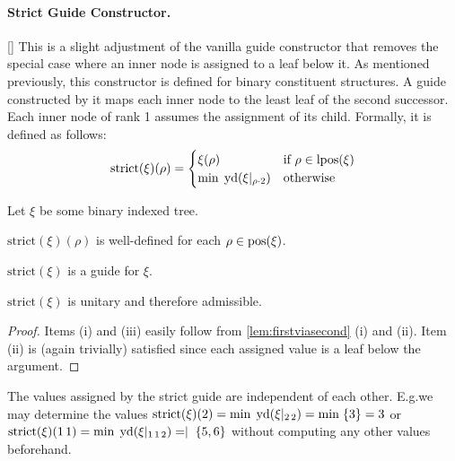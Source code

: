 \documentclass[../../document.tex]{subfiles}
\begin{document}
    \paragraph{Strict Guide Constructor.}[]
    This is a slight adjustment of the vanilla guide constructor that removes the special case where an inner node is assigned to a leaf below it.
    As mentioned previously, this constructor is defined for binary constituent structures.
    A guide constructed by it maps each inner node to the least leaf of the second successor.
    Each inner node of rank 1 assumes the assignment of its child.
    Formally, it is defined as follows:
    \[
    \mathrm{strict}(\xi)(\rho) = \begin{cases}
        \xi(\rho)   & \text{if $\rho \in \operatorname{lpos}(\xi)$}\\
        \min\;\operatorname{yd}(\xi|_{\rho\cdot 2}) &\text{otherwise}
    \end{cases}
    \]

    \begin{theorem}
        Let \(\xi\) be some binary indexed tree.
        \begin{compactenum}
            \item \(\mathrm{strict}(\xi)(\rho)\) is well-defined for each \(\rho \in \operatorname{pos}(\xi)\).
            \item \(\mathrm{strict}(\xi)\) is a guide for \(\xi\).
            \item \(\mathrm{strict}(\xi)\) is unitary and therefore admissible.
        \end{compactenum}
    \end{theorem}

    \begin{proof}
        Items (i) and (iii) easily follow from \cref{lem:firstviasecond} (i) and (ii).
        Item (ii) is (again trivially) satisfied since each assigned value is a leaf below the argument.
    \end{proof}

    \begin{example}
        The values assigned by the strict guide are independent of each other.
        E.g.\@ we may determine the values \(\mathrm{strict}(\xi)(2) = \min\;\operatorname{yd}(\xi|_{2\,2}) = \min\;\{3\} = 3\) or \(\mathrm{strict}(\xi)(1\,1) = \min\;\operatorname{yd}(\xi|_{1\,1\,2}) = \mid\;\{5,6\}\) without computing any other values beforehand.
    \end{example}
\end{document}
